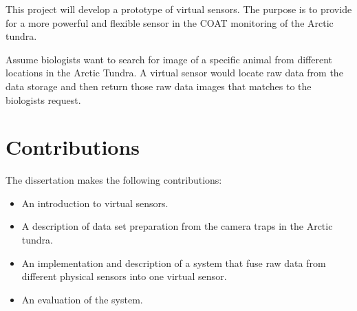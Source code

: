 \documentclass[USenglish]{uit-thesis}
\begin{document}

This project will develop a prototype of virtual sensors. The purpose is to provide for a more powerful and flexible sensor in the COAT monitoring of the Arctic tundra. 

Assume biologists want to search for image of a specific animal from different locations in the Arctic Tundra. A virtual sensor would locate raw data from the data storage and then return those raw data images that matches to the biologists request.



\section{Contributions}

The dissertation makes the following contributions:
\begin{itemize}
\item An introduction to virtual sensors.
\item A description of data set preparation from the camera traps in the Arctic tundra.
\item An implementation and description of a system that fuse raw data from different physical sensors into one virtual sensor.
\item An evaluation of the system.
\end{itemize}


\end{document}
